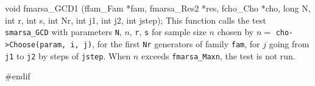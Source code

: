 void fmarsa_GCD1 (ffam_Fam *fam, fmarsa_Res2 *res, fcho_Cho *cho,
                      long N, int r, int s,
                      int Nr, int j1, int j2, int jstep);
\endcode
  \tab  This function calls the test {\tt smarsa\_GCD} with
  parameters {\tt N}, $n$,  {\tt r},  {\tt s} for sample size $n$ chosen
  by $n={}$ {\tt cho->Choose(param, i, j)}, for the first {\tt Nr}
  generators of family {\tt fam}, for $j$ going from {\tt j1} to {\tt j2}
  by steps of {\tt jstep}. When $n$ exceeds
 {\tt fmarsa\_Maxn}, the test is not run.
 \endtab
\code

\hide
#endif
\endhide
\endcode
